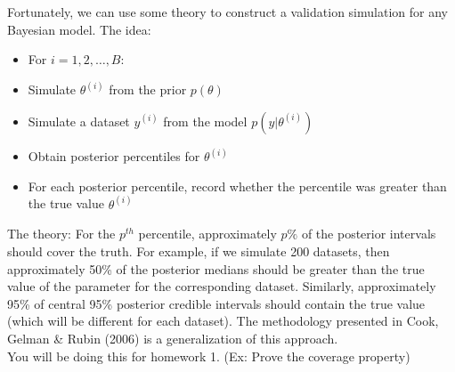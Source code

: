\documentclass[11pt]{article}
\begin{document}
\begin{itemize}
  Fortunately, we can use some theory to construct a validation simulation for any Bayesian model. The idea:
  \begin{itemize}
  \item For $i=1,2,\ldots,B$:
  \item Simulate $\theta^{(i)}$ from the prior $p(\theta)$
  \item Simulate a dataset $y^{(i)}$ from the model $p(y|\theta^{(i)})$
  \item Obtain posterior percentiles for $\theta^{(i)}$
  \item For each posterior percentile, record whether the percentile was greater than the true value $\theta^{(i)}$
  \end{itemize}
  The theory: For the $p^{th}$ percentile, approximately $p\%$ of the posterior intervals should cover the truth. For example, if we simulate 200 datasets, then approximately 50\% of the posterior medians should be greater than the true value of the parameter for the corresponding dataset. Similarly, approximately 95\% of central 95\% posterior credible intervals should contain the true value (which will be different for each dataset). The methodology presented in Cook, Gelman \& Rubin (2006) is a generalization of this approach. \\ 
  $ $\\
  You will be doing this for homework 1. (Ex: Prove the coverage property)
  
\end{itemize}
\end{document}
